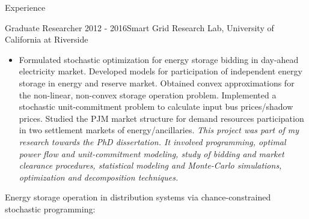 \documentclass{resume} %
\begin{document}
\begin{rSection}{ Experience}
\begin{rSubsection}{Graduate Researcher}{ 2012 - 2016}{Smart Grid Research Lab, University of California at Riverside}{}
\begin{itemize}
\item []	Formulated  stochastic optimization  for energy storage bidding in day-ahead electricity market. 
Developed models for participation of independent  energy storage in energy and  reserve market.
Obtained  convex approximations for the non-linear, non-convex storage operation problem. 
Implemented a stochastic  unit-commitment problem to calculate input bus prices/shadow prices. 
Studied the PJM market structure for demand resources participation in two settlement markets of energy/ancillaries. 
\emph{This project was part of my research towards the PhD dissertation. It involved programming, optimal power flow and unit-commitment modeling,  study of bidding and market clearance procedures, statistical modeling and Monte-Carlo simulations, optimization and decomposition techniques.}
\end{itemize}




\item[] Energy storage operation in distribution systems via  chance-constrained stochastic programming:


\end{rSubsection}
\end{rSection}
\end{document}
